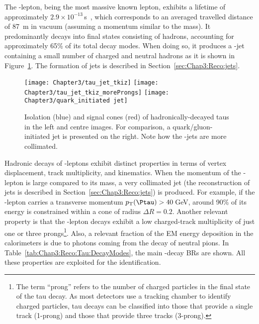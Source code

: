 The \Ptau-lepton, being the most massive known lepton, exhibits a lifetime of approximately 
$2.9 \times 10^{-13}\,$s~\cite{Belle:2013teo}, which corresponds to an averaged travelled 
distance of 87~\textmu m in vacuum (assuming a momentum similar to the \Ptau mass). 
It predominantly decays into final states 
consisting of hadrons, accounting for approximately 65\% of its total decay modes. 
When doing so, it produces a \Ptau-jet containing a small number of
charged and neutral hadrons as it is shown in Figure~\ref{fig:Chap3:tau_jet}.
The formation of jets is described in Section~\ref{sec:Chap3:Reco:jets}.

\begin{figure}[h]
	\centering
 	 \texttt{[image: Chapter3/tau\_jet\_tkiz]}
	 \hspace{0.05\textwidth}
	 \texttt{[image: Chapter3/tau\_jet\_tkiz\_moreProngs]}
	 \hspace{0.05\textwidth}
	 \texttt{[image: Chapter3/quark\_initiated jet]}
	 \caption{Isolation (blue) and signal cones (red) of hadronically-decayed taus in the left
	 and centre images. For comparison, a quark/gluon-initiated jet is presented on the right.
	 Note how the \Ptau-jets are more collimated.}
	\label{fig:Chap3:tau_jet}
\end{figure}

Hadronic decays of \Ptau-leptons exhibit distinct properties in terms of vertex displacement, track multiplicity, and kinematics. 
When the momentum of the \Ptau-lepton is large compared to its mass, a very collimated jet 
(the reconstruction of jets is described in Section~\ref{sec:Chap3:Reco:jets}) is
produced. %
For example, if the \Ptau-lepton carries a transverse momentum $\pT(\Ptau)>40\,$GeV, around
90\% of its energy is constrained within a cone of radius $\Delta R=0.2$. Another relevant property is that the \Ptau-lepton
decays exhibit a low charged-track multiplicity of just one or three prongs\footnote{The term ``prong'' refers to 
the number of charged particles in the final state of the tau decay. As most detectors use a tracking chamber 
to identify charged particles, tau decays can be classified into those that provide a single track (1-prong) 
and those that provide three tracks (3-prong).}. Also, a relevant fraction of the EM energy 
deposition in the calorimeters is due to photons coming from the decay of neutral pions. %
In Table~\ref{tab:Chap3:Reco:Tau:DecayModes},
the main \Ptau-decay BRs are shown. All these properties are exploited for the \tauhad identification.
 
